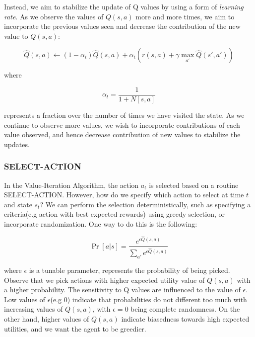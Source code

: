 \documentclass[12pt]{article}
\begin{document}
Instead, we aim to stabilize the update of Q values by using a form of \textit{learning rate}. As we observe the values of $Q(s, a)$ more and more times, we aim to incorporate the previous values seen and decrease the contribution of the new value to $Q(s, a)$:

\begin{equation*}
\hat{Q}(s, a) \leftarrow (1 - \alpha_t)\hat{Q}(s, a) + \alpha_t(r(s, a) + \gamma \max_{a'} \hat{Q}(s', a'))
\end{equation*}

where 

\begin{equation*}
\alpha_t = \frac{1}{1 + N[s, a]}
\end{equation*}

represents a fraction over the number of times we have visited the state. As we continue to observe more values, we wish to incorporate contributions of each value observed, and hence decrease contribution of new values to stabilize the updates.

\subsubsection{\textsc{SELECT-ACTION}}

In the Value-Iteration Algorithm, the action $a_t$ is selected based on a routine \textsc{SELECT-ACTION}. However, how do we specify which action to select at time $t$ and state $s_t$? We can perform the selection deterministically, such as specifying a criteria(e.g action with best expected rewards) using greedy selection, or incorporate randomization. One way to do this is the following:

\begin{equation*}
\Pr[a | s] = \frac{e^{\epsilon \hat{Q}(s, a) }}{\sum_{a'} e^{\epsilon \hat{Q}(s, a) }}
\end{equation*}

where $\epsilon$ is a tunable parameter, represents the probability of being picked. Observe that we pick actions with higher expected utility value of $Q(s, a)$ with a higher probability. The sensitivity to Q values are influenced to the value of $\epsilon$. Low values of $\epsilon$(e.g 0) indicate that probabilities do not different too much with increasing values of $Q(s, a)$, with $\epsilon = 0$ being complete randomness. On the other hand, higher values of $Q(s, a)$ indicate biasedness towards high expected utilities, and we want the agent to be greedier.
\end{document}
